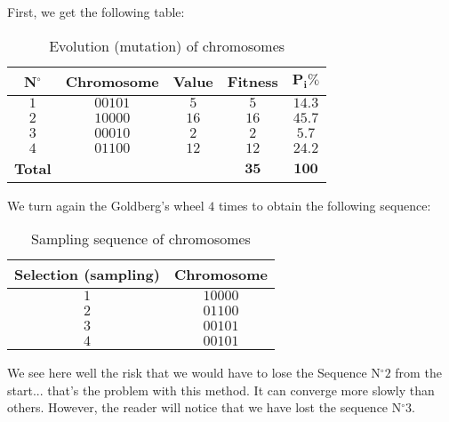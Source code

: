 \begin{tcolorbox}[colframe=black,colback=white,sharp corners]
\begin{enumerate}
		First, we get the following table:
		\begin{table}[H]
		\begin{center}
				\begin{tabular}{|c|c|c|c|c|}
				\hline
				\multicolumn{1}{c}{\cellcolor{black!30}N$^\circ$} & 
	  \multicolumn{1}{c}{\cellcolor{black!30}\textbf{Chromosome}} & 
	  \multicolumn{1}{c}{\cellcolor{black!30}\textbf{Value}} & 
	  \multicolumn{1}{c}{\cellcolor{black!30}\textbf{Fitness}} & 
	  \multicolumn{1}{c}{\cellcolor{black!30}$\mathbf{P_i\%}$} \\ \hline
				\cellcolor{black!30}$1$ & $00101$ & $5$ & $5$ & $14.3$ \\ \hline	
				\cellcolor{black!30}$2$ & $10000$ & $16$ & $16$ & $45.7$ \\ \hline	
				\cellcolor{black!30}$3$ & $00010$ & $2$ & $2$ & $5.7$ \\ \hline	
				\cellcolor{black!30}$4$ & $01100$ & $12$ & $12$ & $24.2$ \\ \hhline{|=|=|=|=|=|}	
				\cellcolor{black!30}\textbf{Total} & & & $\mathbf{35}$ & $\mathbf{100}$ \\ \hline	
				\end{tabular}
		\end{center}
		\caption[]{Evolution (mutation) of chromosomes}
		\end{table}
		We turn again the Goldberg's wheel $4$ times to obtain the following sequence:
		\begin{table}[H]
		\begin{center}
				\begin{tabular}{|c|c|}
				\hline
				\multicolumn{1}{c}{\cellcolor{black!30}\textbf{Selection (sampling)}} & 
	  \multicolumn{1}{c}{\cellcolor{black!30}\textbf{Chromosome}}  \\ \hline
				\cellcolor{black!30}$1$ & $10000$  \\ \hline
				\cellcolor{black!30}$2$ & $01100$  \\ \hline
				\cellcolor{black!30}$3$ & $00101$  \\ \hline
				\cellcolor{black!30}$4$ & $00101$  \\ \hline
				\end{tabular}
		\end{center}
		\caption[]{Sampling sequence of chromosomes}
		\end{table}
		We see here well the risk that we would have to lose the Sequence N$^\circ 2$ from the start... that's the problem with this method. It can converge more slowly than others. However, the reader will notice that we have lost the sequence N$^\circ 3$.


\end{enumerate}
\end{tcolorbox}
